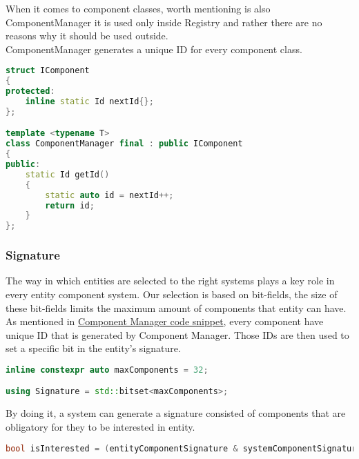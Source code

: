 When it comes to component classes, worth mentioning is also ComponentManager
it is used only inside Registry and rather there are no reasons why it should be used outside.\\
ComponentManager generates a unique ID for every component class.
\label{lst:component_manager}
\begin{lstlisting}[language=c++, caption=IComponent and ComponentManager (./engine/include/tsengine/ecs/ecs.h)]
struct IComponent
{
protected:
    inline static Id nextId{};
};

template <typename T>
class ComponentManager final : public IComponent
{
public:
    static Id getId()
    {
        static auto id = nextId++;
        return id;
    }
};
\end{lstlisting}

\newpage

\subsubsection{Signature}
The way in which  entities are selected to the right systems plays a key role in every entity component system.
Our selection is based on bit-fields, the size of these bit-fields limits the maximum amount of components that entity can have.
As mentioned in \hyperref[lst:component_manager]{Component Manager code snippet}, every component have unique ID that is generated by Component Manager. Those IDs are then used to set a specific bit in the entity's signature.
\begin{lstlisting}[language=c++, caption=Signature (./engine/include/tsengine/ecs/ecs.h)]
inline constexpr auto maxComponents = 32;

using Signature = std::bitset<maxComponents>;
\end{lstlisting}

By doing it, a system can generate a signature consisted of components that are obligatory for they to be interested in entity.
\begin{lstlisting}[language=c++, caption=Signature evaluation (./engine/include/tsengine/ecs/ecs.h)]
bool isInterested = (entityComponentSignature & systemComponentSignature) == systemComponentSignature;
\end{lstlisting}

\newpage

